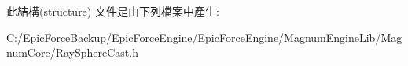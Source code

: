 此結構(structure) 文件是由下列檔案中產生\+:\begin{DoxyCompactItemize}
\item 
C\+:/\+Epic\+Force\+Backup/\+Epic\+Force\+Engine/\+Epic\+Force\+Engine/\+Magnum\+Engine\+Lib/\+Magnum\+Core/Ray\+Sphere\+Cast.\+h\end{DoxyCompactItemize}
